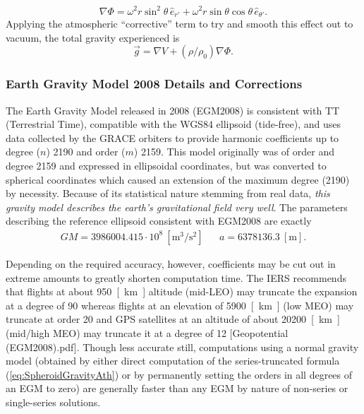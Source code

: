 \documentclass[11pt,dvipsnames]{thesis}
\begin{document}
\begin{equation}
\nabla \Phi = \omega^2 r \sin^2\theta \,\hat{e}_{r'} + \omega^2 r \sin\theta \cos\theta \,\hat{e}_{\theta'}.
\end{equation}
Applying the atmospheric ``corrective'' term to try and smooth this effect out to vacuum, the total gravity experienced 
is
\begin{equation}
\vec{g} = \nabla V + (\rho / \rho_0) \nabla \Phi. \label{eq:GravitationalAccelSPHR}
\end{equation}

\subsubsection{Earth Gravity Model 2008 Details and Corrections}
The Earth Gravity Model released in 2008 (EGM2008) is consistent with TT (Terrestrial Time), compatible with the WGS84 ellipsoid (tide-free), and uses data collected by the GRACE orbiters to provide harmonic coefficients up to degree ($n$) 2190 and order ($m$) 2159. 
This model originally was of order and degree 2159 and expressed in ellipsoidal coordinates, but was converted to spherical coordinates which caused an extension of the maximum degree (2190) by necessity.
Because of its statistical nature stemming from real data, \textit{this gravity model describes the earth's gravitational field very well}.
The parameters describing the reference ellipsoid consistent with EGM2008 are exactly
\begin{align}
GM = 3986004.415 \cdot 10^8 \ [\si{\m\cubed/\s\squared}] && a = 6378136.3 \ [\si{\m}].
\end{align}

Depending on the required accuracy, however, coefficients may be cut out in extreme amounts to greatly shorten computation time. The IERS recommends that flights at about \SI{950}{[\km]} altitude (mid-LEO) may truncate the expansion at a degree of 90 whereas flights at an elevation of \SI{5900}{[\km]} (low MEO) may truncate at order 20 and GPS satellites at an altitude of about \SI{20200}{[\km]} (mid/high MEO) may truncate it at a degree of 12 [Geopotential (EGM2008).pdf]. Though less accurate still, computations using a normal gravity model (obtained by either direct computation of the series-truncated formula (\ref{eq:SpheroidGravityAth}) or by permanently setting the orders in all degrees of an EGM to zero) are generally faster than any EGM by nature of non-series or single-series solutions. 
\end{document}
